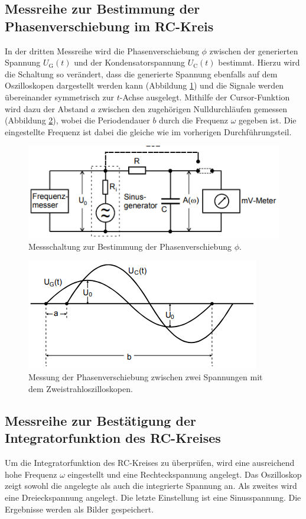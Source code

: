 \subsection{Messreihe zur Bestimmung der Phasenverschiebung im RC-Kreis}
In der dritten Messreihe wird die Phasenverschiebung $\phi$ zwischen der generierten 
Spannung $U_\text{G}(t)$ und der Kondensatorspannung $U_\text{C}(t)$ bestimmt.
Hierzu wird die Schaltung so verändert, dass die generierte Spannung ebenfalls auf 
dem Oszilloskopen dargestellt werden kann (Abbildung \ref{fig:v353_3}) und die Signale 
werden übereinander 
symmetrisch zur $t$-Achse ausgelegt. Mithilfe der Cursor-Funktion wird dazu der Abstand
$a$ zwischen den zugehörigen Nulldurchläufen gemessen (Abbildung \ref{fig:phi}), wobei
die Periodendauer $b$ durch die Frequenz $\omega$ gegeben ist. Die eingestellte Frequenz
ist dabei die gleiche wie im vorherigen Durchführungsteil.
\begin{figure}[H]
  \centering
  \includegraphics{V353_2.png}
  \caption{Messschaltung zur Bestimmung der Phasenverschiebung $\phi$. \cite[S. 7]{kent}}
  \label{fig:v353_3}
\end{figure}
\begin{figure}
  \centering
  \includegraphics{phi.png}
  \caption{Messung der Phasenverschiebung zwischen zwei Spannungen mit dem
Zweistrahloszilloskopen. \cite[S. 7]{kent}}
  \label{fig:phi}
\end{figure}

\subsection{Messreihe zur Bestätigung der Integratorfunktion des RC-Kreises}
Um die Integratorfunktion des RC-Kreises zu überprüfen, wird eine ausreichend hohe
Frequenz $\omega$ eingestellt und eine Rechteckspannung angelegt. Das Oszilloskop 
zeigt sowohl die angelegte als auch die integrierte Spannung an. Als zweites wird eine
Dreieckspannung angelegt. Die letzte Einstellung ist eine Sinusspannung. Die Ergebnisse
werden als Bilder gespeichert.